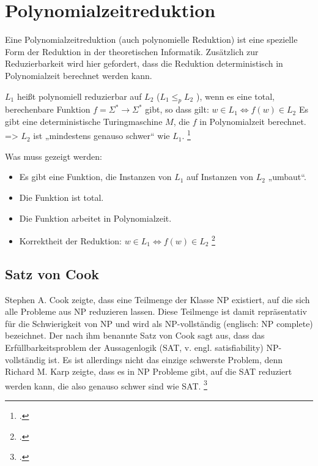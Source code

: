 \documentclass{lehramt-informatik-haupt}
\begin{document}
\section {Polynomialzeitreduktion}

Eine Polynomialzeitreduktion (auch polynomielle Reduktion) ist eine
spezielle Form der Reduktion in der theoretischen Informatik.
Zusätzlich zur Reduzierbarkeit wird hier gefordert, dass die
Reduktion deterministisch in Polynomialzeit berechnet werden kann.

$L_1$ heißt polynomiell reduzierbar auf $L_2$ ($L_1 \leq_p L_2$ ), wenn es
eine total, berechenbare Funktion $f = \Sigma^* \rightarrow \Sigma^*$
gibt, so dass gilt:
$w \in L_1 \Leftrightarrow f(w) \in L_2$
Es gibt
eine deterministische Turingmaschine $M$, die $f$ in Polynomialzeit
berechnet. => $L_2$ ist „mindestens genauso schwer“ wie $L_1$.
\footcite[Seite 64]{theo:fs:4}

Was muss gezeigt werden:

\begin{itemize}
\item Es gibt eine Funktion, die Instanzen von $L_1$ auf Instanzen von
$L_2$ „umbaut“.

\item Die Funktion ist total.

\item Die Funktion arbeitet in Polynomialzeit.

\item Korrektheit der Reduktion: $w \in L_1 \Leftrightarrow f(w) \in L_2$
\footcite[Seite 65]{theo:fs:4}
\end{itemize}


%

\subsection{Satz von Cook}

Stephen A. Cook zeigte, dass eine Teilmenge der Klasse NP existiert, auf
die sich alle Probleme aus NP reduzieren lassen. Diese Teilmenge ist
damit repräsentativ für die Schwierigkeit von NP und wird als
NP-vollständig (englisch: NP complete) bezeichnet. Der nach ihm benannte
Satz von Cook sagt aus, dass das Erfüllbarkeitsproblem der Aussagenlogik
(SAT, v. engl. satisfiability) NP-vollständig ist. Es ist allerdings
nicht das einzige schwerste Problem, denn Richard M. Karp zeigte, dass
es in NP Probleme gibt, auf die SAT reduziert werden kann, die also
genauso schwer sind wie SAT.
\footcite[Seite 70]{theo:fs:4}
\end{document}
